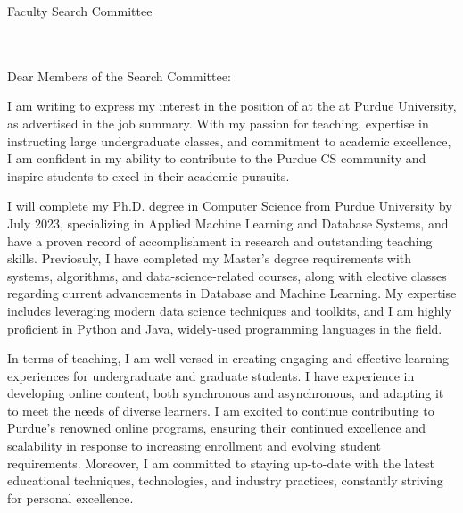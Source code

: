 \documentclass[10pt]{article}
\begin{document}
\thispagestyle{plain}

\pagestyle{empty}

Faculty Search Committee \\
\DepartmentName \\
\InstitutionName \\
\DepartmentAddress

\medskip
Dear Members of the Search Committee:

I am writing to express my interest in the position of \PositionName{} at the \DepartmentName{} at Purdue University, as advertised in the job summary. With my passion for teaching, expertise in instructing large undergraduate classes, and commitment to academic excellence, I am confident in my ability to contribute to the Purdue CS community and inspire students to excel in their academic pursuits.

I will complete my Ph.D. degree in Computer Science from Purdue University by July 2023, specializing in Applied Machine Learning and Database Systems, and have a proven record of accomplishment in research and outstanding teaching skills. Previosuly, I have completed my Master's degree requirements with systems, algorithms, and data-science-related courses, along with elective classes regarding current advancements in Database and Machine Learning. My expertise includes leveraging modern data science techniques and toolkits, and I am highly proficient in Python and Java, widely-used programming languages in the field.

In terms of teaching, I am well-versed in creating engaging and effective learning experiences for undergraduate and graduate students. I have experience in developing online content, both synchronous and asynchronous, and adapting it to meet the needs of diverse learners. I am excited to continue contributing to Purdue's renowned online programs, ensuring their continued excellence and scalability in response to increasing enrollment and evolving student requirements. Moreover, I am committed to staying up-to-date with the latest educational techniques, technologies, and industry practices, constantly striving for personal excellence.
\end{document}
